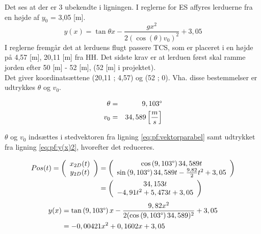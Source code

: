 Det ses at der er 3 ubekendte i ligningen. I reglerne for ES affyres lerduerne fra en højde af \(y_0\) = 3,05 [m].
\begin{equation}
y(x) = \tan \theta x - \frac{gx^2}{2(\cos \left( \theta \right)  v_0)^2} + 3,05
\label{eq:pf:y(x)2}
\end{equation}
I reglerne fremgår det at lerduens flugt passere TCS, som er placeret i en højde på 4,57 [m], 20,11 [m] fra HH. Det sidste krav er at lerduen først skal ramme jorden efter 50 [m] - 52 [m], (52 [m] i projektet). \\
Det giver koordinatsættene (20,11 ; 4,57) og (52 ; 0). Vha. disse bestemmelser er udtrykkes \(\theta\) og \(v_0\).

\begin{eqnarray}
\theta &=& 9,103 \degree \\
v_0 &=& 34,589 \left[ \frac { m }{ s }  \right] 
\end{eqnarray}

 \(\theta\) og \(v_0\) indsættes i stedvektoren fra ligning \ref{eq:pf:vektorparabel} samt udtrykket fra ligning \ref{eq:pf:y(x)2}, hvorefter det reduceres.

\begin{align}
\begin{split}
	Pos(t) = \left( \begin{array}{c}
	x_{2D}(t) \\
	y_{2D}(t)
	\end{array}
	\right)
	&= \left( \begin{array}{c}
	\cos \left(9,103 \degree \right) 34,589 t \\
	\sin \left(9,103 \degree \right) 34,589 t - \frac{9,82}{2} t^2 + 3,05
	\end{array}
	\right) \\
	&= \left( \begin{array}{c}
	34,153 t \\
	- 4,91 t^2 + 5,473 t + 3,05
	\end{array}
	\right)
\label{eq:pf:vektorparabel2}
\end{split}
\end{align}
\begin{align}
\begin{split}
y(x) &= \tan \left(9,103 \degree \right) x - \frac{9,82x^2}{2(\cos \left(9,103 \degree \right) 34,589)^2} + 3,05 \\
&= - 0,00421 x^2 + 0,1602 x  + 3,05
\label{eq:pf:y(x)3}
\end{split}
\end{align}

